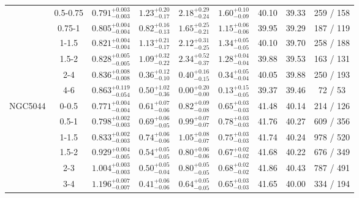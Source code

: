 \documentclass[structabstract]{aa}
\begin{document}
{{\begin{longtable}{lcccccccc}
 & 0.5-0.75 & $ 0.791 _{- 0.003 }^{+ 0.003 } $ & $  1.23 _{-  0.17 }^{+  0.20 } $ & $  2.18 _{-  0.24 }^{+  0.29 } $ & $  1.60 _{-  0.09 }^{+  0.10 } $ &  40.10 & 39.33 &   259 /   158 \\
 & 0.75-1 & $ 0.805 _{- 0.004 }^{+ 0.004 } $ & $  0.82 _{-  0.13 }^{+  0.16 } $ & $  1.65 _{-  0.21 }^{+  0.25 } $ & $  1.15 _{-  0.06 }^{+  0.06 } $ &  39.95 & 39.29 &   187 /   119 \\
 & 1-1.5 & $ 0.821 _{- 0.004 }^{+ 0.004 } $ & $  1.13 _{-  0.17 }^{+  0.21 } $ & $  2.12 _{-  0.25 }^{+  0.31 } $ & $  1.34 _{-  0.05 }^{+  0.05 } $ &  40.10 & 39.70 &   258 /   188 \\
 & 1.5-2 & $ 0.828 _{- 0.005 }^{+ 0.005 } $ & $  1.09 _{-  0.22 }^{+  0.32 } $ & $  2.34 _{-  0.37 }^{+  0.52 } $ & $  1.28 _{-  0.04 }^{+  0.04 } $ &  39.88 & 39.53 &   163 /   131 \\
 & 2-4 & $ 0.836 _{- 0.008 }^{+ 0.008 } $ & $  0.36 _{-  0.10 }^{+  0.12 } $ & $  0.40 _{-  0.15 }^{+  0.16 } $ & $  0.34 _{-  0.04 }^{+  0.05 } $ &  40.05 & 39.88 &   250 /   193 \\
 & 4-6 & $ 0.863 _{- 0.054 }^{+ 0.119 } $ & $  0.50 _{-  0.36 }^{+  1.02 } $ & $  0.00 _{-  0.00 }^{+  0.20 } $ & $  0.13 _{-  0.05 }^{+  0.15 } $ &  39.37 & 39.46 &    72 /    53 \\
\hline
NGC5044 & 0-0.5 & $ 0.771 _{- 0.004 }^{+ 0.004 } $ & $  0.61 _{-  0.06 }^{+  0.07 } $ & $  0.82 _{-  0.08 }^{+  0.09 } $ & $  0.65 _{-  0.03 }^{+  0.03 } $ &  41.48 & 40.14 &   214 /   126 \\
 & 0.5-1 & $ 0.798 _{- 0.003 }^{+ 0.002 } $ & $  0.69 _{-  0.05 }^{+  0.06 } $ & $  0.99 _{-  0.07 }^{+  0.07 } $ & $  0.78 _{-  0.03 }^{+  0.03 } $ &  41.76 & 40.27 &   609 /   356 \\
 & 1-1.5 & $ 0.833 _{- 0.003 }^{+ 0.002 } $ & $  0.74 _{-  0.06 }^{+  0.06 } $ & $  1.05 _{-  0.07 }^{+  0.08 } $ & $  0.75 _{-  0.03 }^{+  0.03 } $ &  41.74 & 40.24 &   978 /   520 \\
 & 1.5-2 & $ 0.929 _{- 0.005 }^{+ 0.004 } $ & $  0.54 _{-  0.05 }^{+  0.05 } $ & $  0.80 _{-  0.06 }^{+  0.06 } $ & $  0.67 _{-  0.02 }^{+  0.02 } $ &  41.68 & 40.22 &   676 /   349 \\
 & 2-3 & $ 1.004 _{- 0.003 }^{+ 0.003 } $ & $  0.50 _{-  0.04 }^{+  0.05 } $ & $  0.80 _{-  0.05 }^{+  0.05 } $ & $  0.68 _{-  0.02 }^{+  0.02 } $ &  41.86 & 40.43  &   787 /   491 \\
 & 3-4 & $ 1.196 _{- 0.007 }^{+ 0.007 } $ & $  0.41 _{-  0.06 }^{+  0.06 } $ & $  0.64 _{-  0.05 }^{+  0.05 } $ & $  0.65 _{-  0.03 }^{+  0.03 } $ &  41.65 & 40.00  &   334 /   194 \\

\end{longtable}}}
\end{document}
